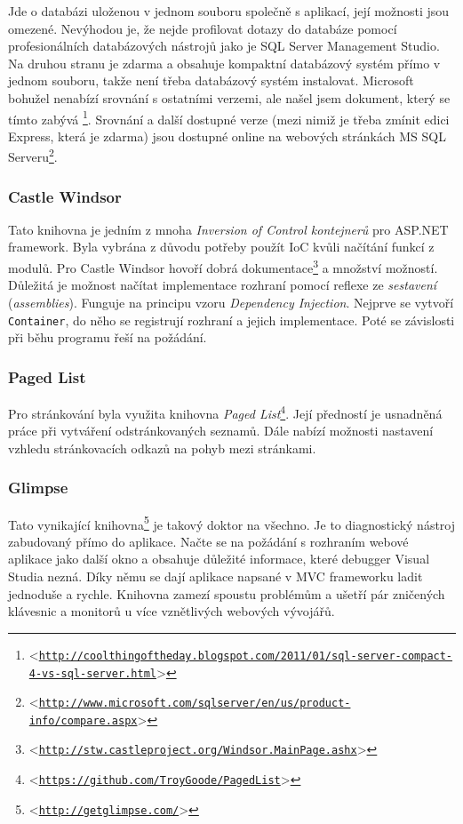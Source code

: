 \documentclass[11pt,twoside,a4paper]{book}
\let\oldUrl\url
\renewcommand\url[1]{<\texttt{\oldUrl{#1}}>}
\begin{document}
Jde o databázi uloženou v jednom souboru společně s aplikací, její možnosti jsou omezené. Nevýhodou je, že nejde profilovat dotazy do databáze pomocí profesionálních databázových nástrojů jako je SQL Server Management Studio. Na druhou stranu je zdarma a obsahuje kompaktní databázový systém přímo v jednom souboru, takže není třeba databázový systém instalovat. Microsoft bohužel nenabízí srovnání s ostatními verzemi, ale našel jsem dokument, který se tímto zabývá \footnote{\url{http://coolthingoftheday.blogspot.com/2011/01/sql-server-compact-4-vs-sql-server.html}}. Srovnání a další dostupné verze (mezi nimiž je třeba zmínit edici Express, která je zdarma) jsou dostupné online na webových stránkách MS SQL Serveru\footnote{\url{http://www.microsoft.com/sqlserver/en/us/product-info/compare.aspx}}.


\subsubsection{Castle Windsor}
Tato knihovna je jedním z mnoha \textit{Inversion of Control kontejnerů} pro ASP.NET framework. Byla vybrána z důvodu potřeby použít IoC kvůli načítání funkcí z modulů. Pro Castle Windsor hovoří dobrá dokumentace\footnote{\url{http://stw.castleproject.org/Windsor.MainPage.ashx}} a množství možností. Důležitá je možnost načítat implementace rozhraní pomocí reflexe ze \textit{sestavení} (\textit{assemblies}). Funguje na principu vzoru \textit{Dependency Injection}. Nejprve se vytvoří \texttt{Container}, do něho se registrují rozhraní a jejich implementace. Poté se závislosti při běhu programu řeší na požádání.

\subsubsection{Paged List}
Pro stránkování byla využita knihovna \textit{Paged List}\footnote{\url{https://github.com/TroyGoode/PagedList}}. Její předností je usnadněná práce při vytváření odstránkovaných seznamů. Dále nabízí možnosti nastavení vzhledu stránkovacích odkazů na pohyb mezi stránkami.

\subsubsection{Glimpse}
\label{glimpse}
Tato vynikající knihovna\footnote{\url{http://getglimpse.com/}} je takový doktor na všechno. Je to diagnostický nástroj zabudovaný přímo do aplikace. Načte se na požádání s rozhraním webové aplikace jako další okno a obsahuje důležité informace, které debugger Visual Studia nezná. Díky němu se dají aplikace napsané v MVC frameworku ladit jednoduše a rychle. Knihovna zamezí spoustu problémům a ušetří pár zničených klávesnic a monitorů u více vznětlivých webových vývojářů.
\end{document}
